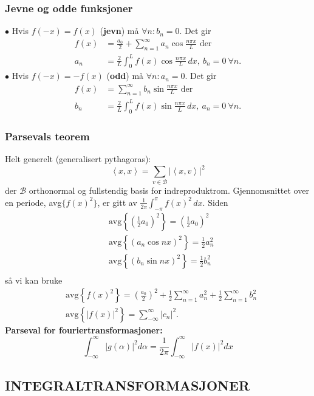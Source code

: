 \documentclass[a4paper, norsk, 8pt]{article}
\newcommand{\EQU}[1] { \begin{equation*} \begin{split}
#1  
\end{split} \end{equation*} }
\newcommand{\expe}[1] { \left\langle#1\right\rangle }
\begin{document}
\begin{multicols*}{2}
\subsubsection*{\small Jevne og odde funksjoner}
$\bullet$ Hvis $f(-x)=f(x)$ (\textbf{jevn}) må $\forall n: b_n=0 $. Det gir 
\EQU{
f(x) &=\frac{a_0}{2}+\sum_{n=1}^\infty a_n \cos \frac{n\pi x}{L} \mbox{ der } \\
a_n &=\frac{2}{L}\int_0^L f(x)\cos \frac{n\pi x}{L}\, dx, \ b_n=0 \ \forall n.
}
$\bullet$ Hvis $f(-x)=-f(x)$ (\textbf{odd}) må $\forall n: a_n=0 $. Det gir
\EQU{
f(x) &=\sum_{n=1}^\infty b_n \sin \frac{n\pi x}{L} \mbox{ der } \\
b_n &=\frac{2}{L}\int_0^L f(x)\sin \frac{n\pi x}{L}\, dx, \ a_n=0 \ \forall n.
}

\subsubsection*{\small Parsevals teorem}
Helt generelt (generalisert pythagoras): 
\[\expe{x,x}=\sum_{v\in \mathcal{B}}|\expe{x,v}|^2\]
der $\mathcal{B}$ orthonormal og fullstendig basis for indreproduktrom.
Gjennomsnittet over en periode, avg$\{f(x)^2\}$, er gitt av $\frac{1}{2\pi}\int_{-\pi}^{\pi}f(x)^2\, dx$. Siden
\EQU{ 
&\mbox{avg}\left\{\left(\frac{1}{2}a_0\right)^2\right\}=\left(\frac{1}{2}a_0\right)^2 \\
&\mbox{avg}\left\{\left(a_n \cos nx\right)^2\right\}=\frac{1}{2}a_n^2 \\
&\mbox{avg}\left\{\left(b_n \sin nx\right)^2\right\}=\frac{1}{2}b_n^2 \\
}
så vi kan bruke 
\EQU{
&\mbox{avg}\left\{ f(x)^2 \right\}=\left(\frac{a_0}{2}\right)^2+\frac{1}{2}\sum_{n=1}^\infty a_n^2+\frac{1}{2}\sum_{n=1}^\infty b_n^2  \\
&\mbox{avg}\left\{ |f(x)|^2 \right\}=\sum_{-\infty}^{\infty}|c_n|^2.
}
\textbf{Parseval for fouriertransformasjoner:} 
\[\int_{-\infty}^{\infty}|g(\alpha)|^2d\alpha=\frac{1}{2\pi}\int_{-\infty}^{\infty}|f(x)|^2dx\]


\subsection*{\footnotesize INTEGRALTRANSFORMASJONER }

\end{multicols*}
\end{document}

